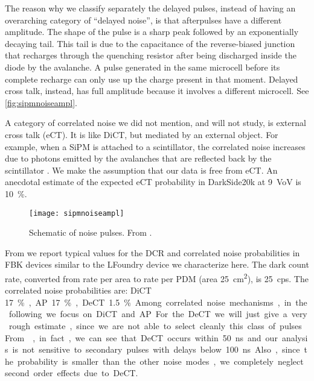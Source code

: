 The reason why we classify separately the delayed pulses, instead of having an
overarching category of ``delayed noise'', is that afterpulses have a different
amplitude. The shape of the pulse is a sharp peak followed by an exponentially
decaying tail. This tail is due to the capacitance of the reverse-biased
junction that recharges through the quenching resistor after being discharged
inside the diode by the avalanche. A pulse generated in the same microcell
before its complete recharge can only use up the charge present in that moment.
Delayed cross talk, instead, has full amplitude because it involves a different
microcell. See \autoref{fig:sipmnoiseampl}.

A category of correlated noise we did not mention, and will not study, is
external cross talk (eCT). It is like DiCT, but mediated by an external object.
For example, when a SiPM is attached to a scintillator, the correlated noise
increases due to photons emitted by the avalanches that are reflected back by
the scintillator \cite[8]{gola2014}. We make the assumption that our data is
free from eCT. An anecdotal estimate of the expected eCT probability in
DarkSide20k at \SI{9}{VoV} is \SI{10}\%.

\begin{figure}
    
    \centering
    \texttt{[image: sipmnoiseampl]}
    
    \caption{\label{fig:sipmnoiseampl} Schematic of noise pulses. From
    \cite[4]{nagy2014}.}
    
\end{figure}


From \cite[tab.~3.1~p.~62]{savarese2018} we report typical values for the DCR
and correlated noise probabilities in FBK devices similar to the LFoundry
device we characterize here. The dark count rate, converted from rate per area
to rate per PDM (area \SI{25}{cm^2}), is \SI{25}{cps}. The correlated noise
probabilities are: DiCT \SI{17}\%, AP \SI{17}\%, DeCT \SI{1.5}\%.

Among correlated noise mechanisms, in the following we focus on DiCT and AP.
For the DeCT we will just give a very rough estimate, since we are not able to
select cleanly this class of pulses. From \cite[fig.~3.8~p.~54]{savarese2018},
in fact, we can see that DeCT occurs within \SI{50}{ns} and our analysis is not
sensitive to secondary pulses with delays below \SI{100}{ns}. Also, since the
probability is smaller than the other noise modes, we completely neglect second
order effects due to DeCT.

